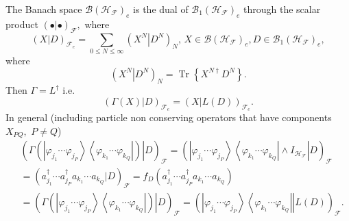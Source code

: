 \documentclass[aps,preprint]{revtex4}%
\begin{document}
The Banach space $\mathcal{B}\left(  \mathcal{H}_{\mathcal{F}}\right)  _{e}$
is the dual of $\mathcal{B}_{1}\left(  \mathcal{H}_{\mathcal{F}}\right)  _{e}$
through the scalar product $\left(  \bullet\left\vert \bullet\right.  \right)
_{\mathcal{F}},$ where
\begin{equation}
\left(  X\left\vert D\right.  \right)  _{\mathcal{F}_{e}}=\sum_{0\leq
N\leq\infty}\left(  X^{N}\left\vert D^{N}\right.  \right)  _{N},\,X\in
\mathcal{B}\left(  \mathcal{H}_{\mathcal{F}}\right)  _{e},D\in\mathcal{B}%
_{1}\left(  \mathcal{H}_{\mathcal{F}}\right)  _{e},
\end{equation}
where
\begin{equation}
\left(  X^{N}\left\vert D^{N}\right.  \right)  _{N}=\operatorname*{Tr}\left\{
X^{N\dagger}D^{N}\right\}  .
\end{equation}
Then $\Gamma=L^{\dagger}$ \cite{Kummar} i.e.
\begin{equation}
\left(  \Gamma\left(  X\right)  \left\vert D\right.  \right)  _{\mathcal{F}%
_{e}}=\left(  X\left\vert L\left(  D\right)  \right.  \right)  _{\mathcal{F}%
_{e}}.
\end{equation}
In general (including particle non conserving operators that have components
$X_{PQ},$ $P\neq Q$)
\begin{align}
&  \left(  \left.  \Gamma\left(  \left\vert \varphi_{j_{1}}\cdots
\varphi_{j_{P}}\right\rangle \left\langle \varphi_{k_{1}}\cdots\varphi_{k_{Q}%
}\right\vert \right)  \right\vert D\right)  _{\mathcal{F}}=\left(  \left.
\left\vert \varphi_{j_{1}}\cdots\varphi_{j_{P}}\right\rangle \left\langle
\varphi_{k_{1}}\cdots\varphi_{k_{Q}}\right\vert \wedge I_{\mathcal{H}%
_{\mathcal{F}}}\right\vert D\right)  _{\mathcal{F}}\nonumber\\
&  \left.  =\right.  \left(  a_{j_{1}}^{\dagger}\cdots a_{j_{P}}^{\dagger
}a_{k_{1}}\cdots a_{k_{Q}}\left\vert D\right.  \right)  _{\mathcal{F}}%
=f_{D}\left(  a_{j_{1}}^{\dagger}\cdots a_{j_{P}}^{\dagger}a_{k_{1}}\cdots
a_{k_{Q}}\right) \nonumber\\
&  \left.  =\right.  \left(  \left.  \Gamma\left(  \left\vert \varphi_{j_{1}%
}\cdots\varphi_{j_{P}}\right\rangle \left\langle \varphi_{k_{1}}\cdots
\varphi_{k_{Q}}\right\vert \right)  \right\vert D\right)  _{\mathcal{F}%
}=\left(  \left.  \left\vert \varphi_{j_{1}}\cdots\varphi_{j_{P}}\right\rangle
\left\langle \varphi_{k_{1}}\cdots\varphi_{k_{Q}}\right\vert \right\vert
L\left(  D\right)  \right)  _{\mathcal{F}}.
\end{align}
\end{document}
